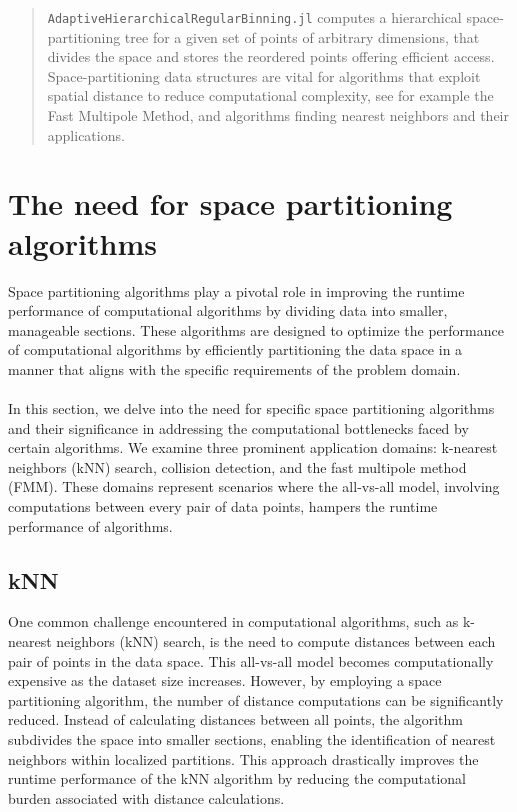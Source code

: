 \documentclass{juliacon}
\begin{document}


\maketitle

\begin{abstract}

\verb|AdaptiveHierarchicalRegularBinning.jl| computes a hierarchical space-partitioning
tree for a given set of points of arbitrary dimensions, that divides the space and
stores the reordered points offering efficient access. Space-partitioning data
structures are vital for algorithms that exploit spatial distance to reduce
computational complexity, see for example the Fast Multipole Method, and algorithms
finding nearest neighbors and their applications.

\end{abstract}


\section{The need for space partitioning algorithms}
Space partitioning algorithms play a pivotal role in improving the runtime
performance of computational algorithms by dividing data into smaller,
manageable sections. These algorithms are designed to optimize the performance
of computational algorithms by efficiently partitioning the data space in a
manner that aligns with the specific requirements of the problem domain.
\\\\
In this section, we delve into the need for specific space partitioning
algorithms and their significance in addressing the computational bottlenecks
faced by certain algorithms. We examine three prominent application domains:
k-nearest neighbors (kNN) search, collision detection, and the fast multipole
method (FMM). These domains represent scenarios where the all-vs-all model,
involving computations between every pair of data points, hampers the runtime
performance of algorithms.

\subsection{kNN}
One common challenge encountered in computational algorithms, such as k-nearest
neighbors (kNN) search, is the need to compute distances between each pair of
points in the data space. This all-vs-all model becomes computationally
expensive as the dataset size increases. However, by employing a space
partitioning algorithm, the number of distance computations can be
significantly reduced. Instead of calculating distances between all points,
the algorithm subdivides the space into smaller sections, enabling the
identification of nearest neighbors within localized partitions. This approach
drastically improves the runtime performance of the kNN algorithm by reducing
the computational burden associated with distance calculations.
\end{document}
